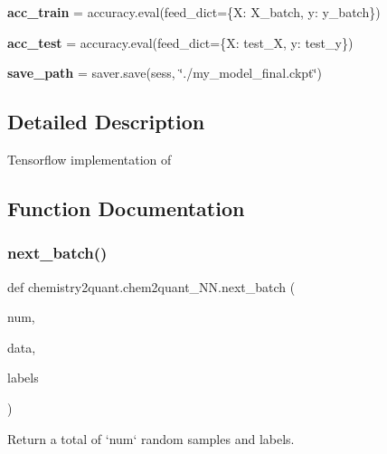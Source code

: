 \begin{DoxyCompactItemize}
{\bfseries acc\+\_\+train} = accuracy.\+eval(feed\+\_\+dict=\{X\+: X\+\_\+batch, y\+: y\+\_\+batch\})
\item
\mbox{\label{namespacechemistry2quant_1_1chem2quant__NN_a67145a74ce2fac9a16f2dc7efe4587ca}}
{\bfseries acc\+\_\+test} = accuracy.\+eval(feed\+\_\+dict=\{X\+: test\+\_\+X, y\+: test\+\_\+y\})
\item
\mbox{\label{namespacechemistry2quant_1_1chem2quant__NN_a376410e5c5692144e1a528a4f8b9d85a}}
{\bfseries save\+\_\+path} = saver.\+save(sess, \char`\"{}./my\+\_\+model\+\_\+final.\+ckpt\char`\"{})
\end{DoxyCompactItemize}


\subsection{Detailed Description}
\begin{DoxyVerb}Tensorflow implementation of
\end{DoxyVerb}


\subsection{Function Documentation}
\mbox{\label{namespacechemistry2quant_1_1chem2quant__NN_afb055d34a228ae670b94588087aa897e}}
\subsubsection{\texorpdfstring{next\+\_\+batch()}{next\_batch()}}
{\footnotesize\ttfamily def chemistry2quant.\+chem2quant\+\_\+\+N\+N.\+next\+\_\+batch (\begin{DoxyParamCaption}\item[{}]{num,  }\item[{}]{data,  }\item[{}]{labels }\end{DoxyParamCaption})}

\begin{DoxyVerb}Return a total of `num` random samples and labels.
\end{DoxyVerb}
